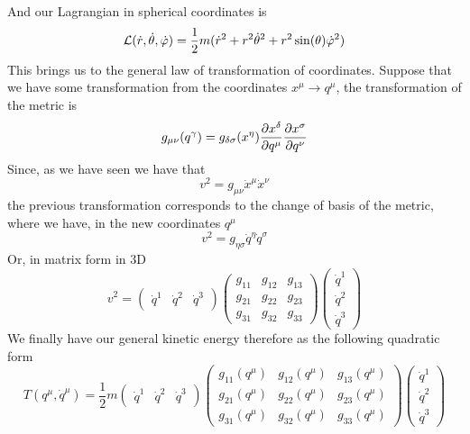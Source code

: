 \documentclass[../admech.tex]{subfiles}
\begin{document}
And our Lagrangian in spherical coordinates is
\begin{equation*}
	\mathcal{L}(\dot{r},\dot{\theta},\dot{\varphi})=\frac{1}{2}m(\dot{r}^2+r^2\dot{\theta}^2+r^2\sin(\theta)\dot{\varphi}^2)
\end{equation*}
This brings us to the general law of transformation of coordinates. Suppose that we have some transformation from the coordinates $x^\mu\to q^\mu$, the transformation of the metric is
\begin{equation*}
	g_{\mu\nu}(q^\gamma)=g_{\delta\sigma}(x^\eta)\pdv{x^\delta}{q^\mu}\pdv{x^\sigma}{q^\nu}
\end{equation*}
Since, as we have seen we have that
\begin{equation*}
	v^2=g_{\mu\nu}\dot{x}^\mu\dot{x}^\nu
\end{equation*}
the previous transformation corresponds to the change of basis of the metric, where we have, in the new coordinates $q^\mu$
\begin{equation*}
	v^2=g_{\eta\sigma}\dot{q}^\eta\dot{q}^\sigma
\end{equation*}
Or, in matrix form in 3D
\begin{equation}
	v^2=\begin{pmatrix}\dot{q}^1&\dot{q}^2&\dot{q}^3\end{pmatrix}\begin{pmatrix}g_{11}&g_{12}&g_{13}\\g_{21}&g_{22}&g_{23}\\g_{31}&g_{32}&g_{33}\end{pmatrix}\begin{pmatrix}\dot{q}^1\\\dot{q}^2\\\dot{q}^3\end{pmatrix}
	\label{eq:genvecsq}
\end{equation}
We finally have our general kinetic energy therefore as the following quadratic form
\begin{equation}
	T(q^\mu,\dot{q}^\mu)=\frac{1}{2}m\begin{pmatrix}\dot{q}^1&\dot{q}^2&\dot{q}^3\end{pmatrix}\begin{pmatrix}g_{11}(q^\mu)&g_{12}(q^\mu)&g_{13}(q^\mu)\\g_{21}(q^\mu)&g_{22}(q^\mu)&g_{23}(q^\mu)\\g_{31}(q^\mu)&g_{32}(q^\mu)&g_{33}(q^\mu)\end{pmatrix}\begin{pmatrix}\dot{q}^1\\\dot{q}^2\\\dot{q}^3\end{pmatrix}
	\label{eq:kinquadform}
\end{equation}
\end{document}
